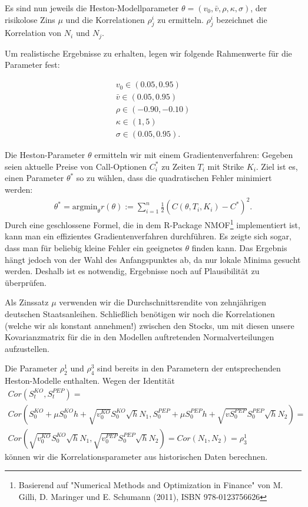 \documentclass[12pt]{article}
\begin{document}
	Es sind nun jeweils die Heston-Modellparameter $\theta=(v_0,\bar v, \rho, \kappa, \sigma)$, der risikolose Zins $\mu$ und die Korrelationen $\rho^i_j$ zu ermitteln. $\rho^{i}_j$ bezeichnet die Korrelation von $N_i$ und $N_j$.
	
	Um realistische Ergebnisse zu erhalten, legen wir folgende Rahmenwerte für die Parameter fest:
	
	
	
	
	
	
	\begin{gather*}
	v_0 \in (0.05,0.95) \\
	\bar v  \in (0.05,0.95) \\
	\rho \in (-0.90,-0.10) \\
	\kappa \in (1,5) \\
	\sigma \in (0.05,0.95).
	\end{gather*}
	
	
	
	
	Die Heston-Parameter $\theta$ ermitteln wir mit einem Gradientenverfahren: Gegeben seien aktuelle Preise von Call-Optionen $C_i^*$ zu Zeiten $T_i$ mit Strike $K_i$. Ziel ist es, einen Parameter $\theta^*$ so zu wählen, dass die quadratischen Fehler minimiert werden:
	\begin{gather*}
	\theta^*=\text{argmin}_{\theta} r(\theta):=\sum_{i=1}^n \frac12 (C(\theta,T_i,K_i)-C^*)^2.
	\end{gather*}
	Durch eine geschlossene Formel, die in dem R-Package \glqq NMOF\grqq\footnote{Basierend auf "Numerical Methods and Optimization in Finance" von M. Gilli, D. Maringer und E. Schumann (2011), ISBN 978-0123756626} implementiert ist, kann man ein effizientes Gradientenverfahren durchführen. Es zeigte sich sogar, dass man für beliebig kleine Fehler ein geeignetes $\theta$ finden kann. Das Ergebnis hängt jedoch von der Wahl des Anfangspunktes ab, da nur lokale Minima gesucht werden. Deshalb ist es notwendig, Ergebnisse noch auf Plausibilität zu überprüfen.
	
	Als Zinssatz $\mu$ verwenden wir die Durchschnittsrendite von zehnjährigen deutschen Staatsanleihen. 
	Schließlich benötigen wir noch die Korrelationen (welche wir als konstant annehmen!) zwischen den Stocks, um mit diesen unsere Kovarianzmatrix für die in den Modellen auftretenden Normalverteilungen aufzustellen.
	
	Die Parameter $\rho^1_2$ und $\rho^3_4$ sind bereits in den Parametern der entsprechenden Heston-Modelle enthalten. 
	Wegen der Identität
	\begin{gather*}
	Cor(S^{KO}_t,S^{PEP}_t)= \\
	Cor\left(S^{KO}_0+\mu S^{KO}_0h+\sqrt{v^{KO}_0}S^{KO}_0\sqrt{h}N_1,S^{PEP}_0+\mu S^{PEP}_0h+\sqrt{vS^{PEP}_0}S^{PEP}_0\sqrt{h}N_2\right)= \\
	Cor\left(\sqrt{v^{KO}_0}S^{KO}_0\sqrt{h}N_1,\sqrt{v^{PEP}_0}S^{PEP}_0\sqrt{h}N_2\right)=Cor(N_1,N_2)=\rho^1_3
	\end{gather*}
	können wir die Korrelationsparameter aus historischen Daten berechnen.
	
\end{document}
